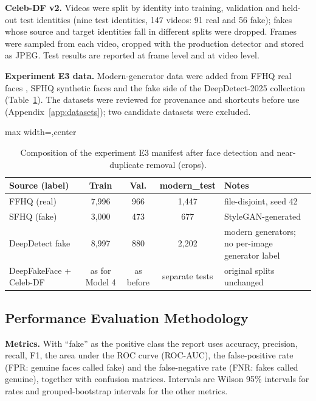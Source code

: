 \textbf{Celeb-DF v2.} Videos \citep{li2020celebdf} were split by identity into training, validation and held-out test identities (nine test identities,
147 videos: 91 real and 56 fake); fakes whose source and target identities fall in different splits were dropped. Frames were sampled from
each video, cropped with the production detector and stored as JPEG. Test results are reported at frame level and at video level.

\textbf{Experiment E3 data.} Modern-generator data were added from FFHQ real faces \citep{karras2019stylegan}, SFHQ synthetic faces
\citep{sfhq2022} and the fake side of the DeepDetect-2025 collection (Table~\ref{tab:e3data}). The datasets were reviewed for provenance and
shortcuts before use (Appendix~\ref{app:datasets}); two candidate datasets were excluded.

\begin{table}[ht]
\centering
\caption[Composition of the experiment E3 manifest after face detection and near-duplicate removal]{Composition of the experiment E3 manifest after face detection and near-duplicate removal (crops).}
\label{tab:e3data}
\small
\begin{adjustbox}{max width=\linewidth,center}
\begin{tabular}{|p{3.3cm}|c|c|c|p{4.0cm}|}
\hline
\textbf{Source (label)} & \textbf{Train} & \textbf{Val.} & \textbf{modern\_test} & \textbf{Notes} \\ \hline
FFHQ (real) & 7{,}996 & 966 & 1{,}447 & file-disjoint, seed 42 \\ \hline
SFHQ (fake) & 3{,}000 & 473 & 677 & StyleGAN-generated \\ \hline
DeepDetect fake & 8{,}997 & 880 & 2{,}202 & modern generators; no per-image generator label \\ \hline
DeepFakeFace + Celeb-DF & as for Model 4 & as before & separate tests & original splits unchanged \\ \hline
\end{tabular}
\end{adjustbox}
\end{table}

\subsection{Performance Evaluation Methodology}
\textbf{Metrics.} With ``fake'' as the positive class the report uses accuracy, precision, recall, F1, the area under the ROC curve (ROC-AUC), the
false-positive rate (FPR: genuine faces called fake) and the false-negative rate (FNR: fakes called genuine), together with confusion matrices.
Intervals are Wilson 95\% intervals \citep{wilson1927} for rates and grouped-bootstrap intervals \citep{efron1993bootstrap} for the other metrics.

